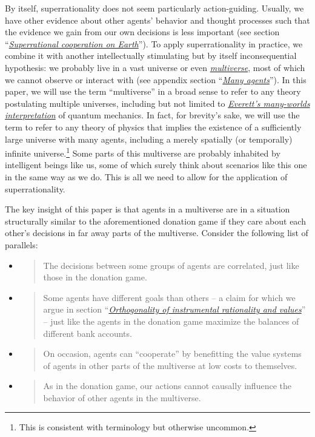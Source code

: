 By itself, superrationality does not seem particularly action-guiding.
Usually, we have other evidence about other agents' behavior and thought
processes such that the evidence we gain from our own decisions is less
important (see section
``\protect\hyperlink{superrational-cooperation-on-earth}{\emph{Superrational
cooperation on Earth}}''). To apply superrationality in practice, we
combine it with another intellectually stimulating but by itself
inconsequential hypothesis: we probably live in a vast universe or even
\href{https://en.wikipedia.org/wiki/Multiverse}{\emph{multiverse}}, most
of which we cannot observe or interact with (see appendix section
``\protect\hyperlink{many-agents}{\emph{Many agents}}''). In this paper,
we will use the term ``multiverse'' in a broad sense to refer to any
theory postulating multiple universes, including but not limited to
\href{https://en.wikipedia.org/wiki/Many-worlds_interpretation}{\emph{Everett's
many-worlds interpretation}} of quantum mechanics. In fact, for
brevity's sake, we will use the term to refer to any theory of physics
that implies the existence of a sufficiently large universe with many
agents, including a merely spatially (or temporally) infinite
universe.\footnote{This is consistent with
  \cite{Tegmark2003-sl} terminology but otherwise
  uncommon.} Some parts of this multiverse are probably inhabited by
intelligent beings like us, some of which surely think about scenarios
like this one in the same way as we do. This is all we need to allow for
the application of superrationality.

The key insight of this paper is that agents in a multiverse are in a
situation structurally similar to the aforementioned donation game if
they care about each other's decisions in far away parts of the
multiverse. Consider the following list of parallels:

\begin{itemize}
\item
  \begin{quote}
  The decisions between some groups of agents are correlated, just like
  those in the donation game.
  \end{quote}
\item
  \begin{quote}
  Some agents have different goals than others -- a claim for which we
  argue in section
  ``\protect\hyperlink{orthogonality-of-instrumental-rationality-and-values}{\emph{Orthogonality
  of instrumental rationality and values}}'' -- just like the agents in
  the donation game maximize the balances of different bank accounts.
  \end{quote}
\item
  \begin{quote}
  On occasion, agents can ``cooperate'' by benefitting the value systems
  of agents in other parts of the multiverse at low costs to themselves.
  \end{quote}
\item
  \begin{quote}
  As in the donation game, our actions cannot causally influence the
  behavior of other agents in the multiverse.
  \end{quote}
\end{itemize}

